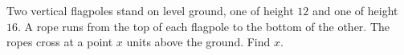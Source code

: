Two vertical flagpoles stand on level ground, one of height $12$ and one of height $16$. A rope runs from the top of each flagpole to the bottom of the other. The ropes cross at a point $x$ units above the ground. Find $x$.
